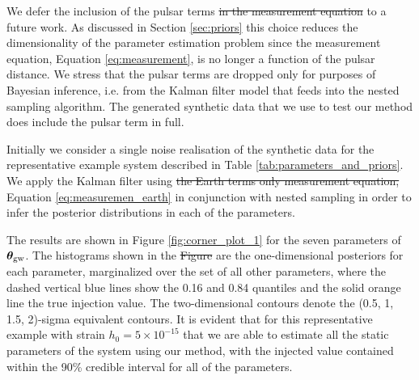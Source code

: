 \documentclass[fleqn,usenatbib,useAMS]{mnras}
\providecommand{\DIFadd}[1]{{\protect\color{blue}\uwave{#1}}} %
\providecommand{\DIFdel}[1]{{\protect\color{red}\sout{#1}}}                      %
\providecommand{\DIFaddbegin}{} %
\providecommand{\DIFaddend}{} %
\providecommand{\DIFdelbegin}{} %
\providecommand{\DIFdelend}{} %
\newcommand{\DIFscaledelfig}{0.5}
\newlength{\DIFdelgraphicswidth} %
\newlength{\DIFdelgraphicsheight} %
\newcommand{\DIFaddincludegraphics}[2][]{{\color{blue}\fbox{\DIFOincludegraphics[#1]{#2}}}} %
\newcommand{\DIFdelincludegraphics}[2][]{%
\sbox{\DIFdelgraphicsbox}{\DIFOincludegraphics[#1]{#2}}%
\settoboxwidth{\DIFdelgraphicswidth}{\DIFdelgraphicsbox} %
\settoboxtotalheight{\DIFdelgraphicsheight}{\DIFdelgraphicsbox} %
\scalebox{\DIFscaledelfig}{%
\parbox[b]{\DIFdelgraphicswidth}{\usebox{\DIFdelgraphicsbox}\\[-\baselineskip] \rule{\DIFdelgraphicswidth}{0em}}\llap{\resizebox{\DIFdelgraphicswidth}{\DIFdelgraphicsheight}{%
\setlength{\unitlength}{\DIFdelgraphicswidth}%
\begin{picture}(1,1)%
\thicklines\linethickness{2pt} %
{\color[rgb]{1,0,0}\put(0,0){\framebox(1,1){}}}%
{\color[rgb]{1,0,0}\put(0,0){\line( 1,1){1}}}%
{\color[rgb]{1,0,0}\put(0,1){\line(1,-1){1}}}%
\end{picture}%
}\hspace*{3pt}}} %
} %
\DeclareRobustCommand{\DIFaddbegin}{\DIFOaddbegin \let\includegraphics\DIFaddincludegraphics} %
\DeclareRobustCommand{\DIFaddend}{\DIFOaddend \let\includegraphics\DIFOincludegraphics} %
\DeclareRobustCommand{\DIFdelbegin}{\DIFOdelbegin \let\includegraphics\DIFdelincludegraphics} %
\DeclareRobustCommand{\DIFdelend}{\DIFOaddend \let\includegraphics\DIFOincludegraphics} %
\begin{document}
	We defer the inclusion of the pulsar terms \DIFdelbegin \DIFdel{in the measurement equation }\DIFdelend to a future work. As discussed in Section \ref{sec:priors} this choice reduces the dimensionality of the parameter estimation problem since the measurement equation, Equation \eqref{eq:measurement}, is no longer a function of the pulsar distance.  We stress that the pulsar terms are dropped only for purposes of Bayesian inference, i.e. from the Kalman filter model that feeds into the nested sampling algorithm. The generated synthetic data that we use to test our method does include the pulsar term in full. \DIFaddbegin \newline 


	\DIFaddend Initially we consider a single noise realisation of the synthetic data for the representative example system described in Table \ref{tab:parameters_and_priors}. We apply the Kalman filter using \DIFdelbegin \DIFdel{the Earth terms only measurement equation, }\DIFdelend Equation \eqref{eq:measuremen_earth} in conjunction with nested sampling in order to infer the posterior distributions in each of the parameters. \DIFdelbegin %

\DIFdelend The results are shown in Figure \ref{fig:corner_plot_1} for the seven parameters of  $\boldsymbol{\theta}_{\rm gw}$. The histograms shown in the \DIFdelbegin \DIFdel{Figure }\DIFdelend \DIFaddbegin \DIFadd{figure }\DIFaddend are the one-dimensional posteriors for each parameter, marginalized over the set of all other parameters, where the dashed vertical blue lines show the 0.16 and 0.84 quantiles and the solid orange line the true injection value. The two-dimensional contours denote the (0.5, 1, 1.5, 2)-sigma equivalent contours. It is evident that for this representative example with \DIFaddbegin \DIFadd{characteristic }\DIFaddend strain $h_0 = 5 \times 10^{-15}$ that we are able to estimate all the static parameters of the system using our method, with the injected value contained within the 90\% credible interval for all of the parameters. \newline 
\end{document}
